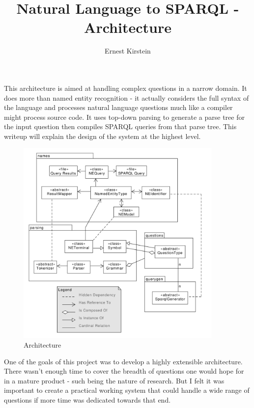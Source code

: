 \documentclass[11pt]{article}
\begin{document}
\title{Natural Language to SPARQL - Architecture}
\author{Ernest Kirstein}
\maketitle

This architecture is aimed at handling complex questions in a narrow domain.
It does more than named entity recognition - it actually considers
the full syntax of the language and processes natural language questions
much like a compiler might process source code. It uses
top-down parsing to generate a parse tree for the input question then
compiles SPARQL queries from that parse tree.
This writeup will explain the design of the system at the highest level.

\begin{figure}[h!]
    \centering
    \includegraphics[width=0.9\textwidth,natwidth=1,natheight=1]{architecture.pdf}
    \caption{Architecture}
    \label{fig:arch}
\end{figure}


One of the goals of this project was to develop a
highly extensible architecture. There wasn't enough time to cover the
breadth of questions one would hope for in a mature product - such being
the nature of research. But I felt it was important to create a practical
working system that could handle a wide range of questions if more
time was dedicated towards that end.
\end{document}

